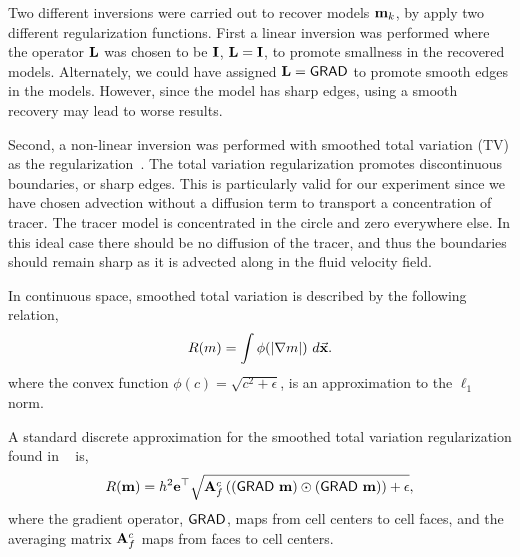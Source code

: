 \documentclass[11pt]{article}
\begin{document}
Two different inversions were carried out to recover models ${\bf{m}}_k$, by apply two different regularization functions.  
First a linear inversion was performed where the operator ${\bf{L}}$ was chosen to be ${\bf{I}}$,  ${\bf{L}} = {\bf{I}}$, to promote smallness in the recovered models. Alternately, we could have assigned ${\bf{L}} = {\textsf{GRAD}}$ to promote smooth edges in the models. However, since the model has sharp edges, using a smooth recovery may lead to worse results. 

Second, a non-linear inversion was performed with smoothed total variation (TV) as the  regularization~\cite{Ascher2006}.
 The total variation regularization promotes discontinuous boundaries, or sharp edges. This is particularly valid for our experiment since we have chosen advection without a diffusion term to transport a concentration of tracer. The tracer model is  concentrated in the circle and zero everywhere else. In this ideal case there should be no diffusion of the tracer, and thus the boundaries should remain sharp as it is advected along in the fluid velocity field.

In continuous space, smoothed total variation is described by the following relation,
\begin{equation}
		R(m) =  \int  \phi(|{\bf{ \nabla}} m|) \ d\vec {\bf x}.
\end{equation} 
where the convex function $\phi(c) = \sqrt{c^2 + \epsilon}$, is an approximation to the $\ell_1$ norm. 

A standard discrete 
approximation for the smoothed total variation regularization found in ~\cite{Ascher2006} is, 
\begin{equation}
\label{regsd}
R({\bf{m}}) =  h^2 {\bf{e}}^{\top} \sqrt{ {\bf{A}}_{f}^{c} \left( ({\textsf{GRAD}}\ {\bf{m}}) \odot ({\textsf{GRAD}}\ {\bf{m}}) \right)  + \epsilon},
\end{equation}
where the  gradient operator, ${\textsf{GRAD}}$,   maps from cell centers to cell faces, and the averaging matrix ${\bf{A}}_{f}^{c}$ maps from faces to cell centers. 
\end{document}
